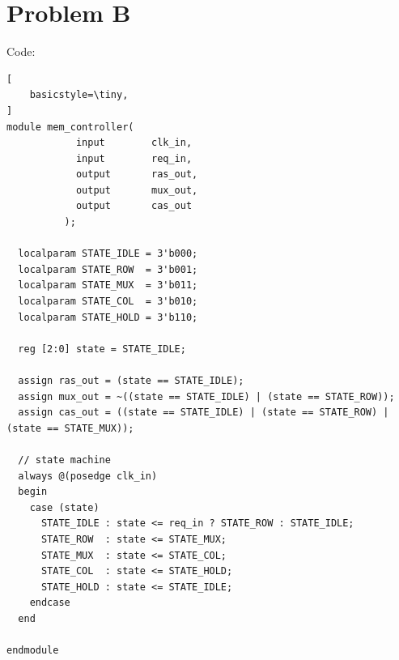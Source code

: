 \documentclass[12pt]{article}
\begin{document}
\section{Problem B}
Code:
\begin{lstlisting}[
    basicstyle=\tiny,
]
module mem_controller(
            input        clk_in,
            input        req_in,
            output       ras_out,
            output       mux_out,
            output       cas_out
          );

  localparam STATE_IDLE = 3'b000;
  localparam STATE_ROW  = 3'b001;
  localparam STATE_MUX  = 3'b011;
  localparam STATE_COL  = 3'b010;
  localparam STATE_HOLD = 3'b110;

  reg [2:0] state = STATE_IDLE;

  assign ras_out = (state == STATE_IDLE);
  assign mux_out = ~((state == STATE_IDLE) | (state == STATE_ROW));
  assign cas_out = ((state == STATE_IDLE) | (state == STATE_ROW) | (state == STATE_MUX));

  // state machine
  always @(posedge clk_in)
  begin
    case (state)
      STATE_IDLE : state <= req_in ? STATE_ROW : STATE_IDLE;
      STATE_ROW  : state <= STATE_MUX;
      STATE_MUX  : state <= STATE_COL;
      STATE_COL  : state <= STATE_HOLD;
      STATE_HOLD : state <= STATE_IDLE;
    endcase
  end

endmodule
\end{lstlisting}
\end{document}

